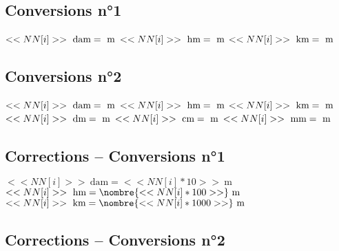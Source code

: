 \documentclass[a4paper,11pt,fleqn]{article}
\begin{document}
\pagestyle{empty}


\subsection*{Conversions n°1}

\begin{multicols}{4}


$<<NN[i]>>~\text{dam}=\dotfill~\text{m}$
$<<NN[i]>>~\text{hm}=\dotfill~\text{m}$
$<<NN[i]>>~\text{km}=\dotfill~\text{m}$

\end{multicols}

\subsection*{Conversions n°2}

\begin{multicols}{4}


$<<NN[i]>>~\text{dam}=\dotfill~\text{m}$
$<<NN[i]>>~\text{hm}=\dotfill~\text{m}$
$<<NN[i]>>~\text{km}=\dotfill~\text{m}$
$<<NN[i]>>~\text{dm}=\dotfill~\text{m}$
$<<NN[i]>>~\text{cm}=\dotfill~\text{m}$
$<<NN[i]>>~\text{mm}=\dotfill~\text{m}$

	
\end{multicols}


\subsection*{Corrections -- Conversions n°1}

\begin{multicols}{4}


$<<NN[i]>>~\text{dam}=<<NN[i]*10>>~\text{m}$
$<<NN[i]>>~\text{hm}=\nombre{<<NN[i]*100>>}~\text{m}$
$<<NN[i]>>~\text{km}=\nombre{<<NN[i]*1000>>}~\text{m}$

	
\end{multicols}



\subsection*{Corrections -- Conversions n°2}
\end{document}
